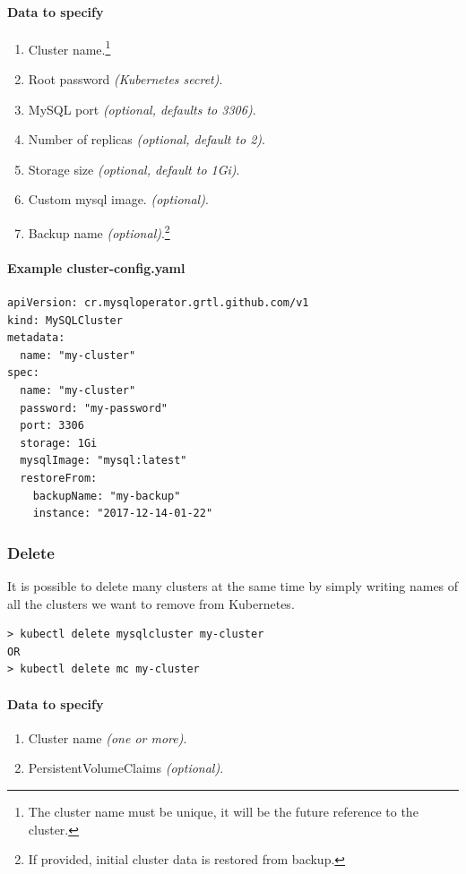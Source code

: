 \paragraph{Data to specify}
\begin{enumerate}
	\item Cluster name.\footnote{The cluster name must be unique, it will be the future reference
	to the cluster.}
	\item Root password \textit{(Kubernetes secret)}.
	\item MySQL port \textit{(optional, defaults to 3306)}.
	\item Number of replicas \textit{(optional, default to 2)}.
	\item Storage size \textit{(optional, default to 1Gi)}.
	\item Custom mysql image. \textit{(optional)}.
	\item Backup name \textit{(optional)}.\footnote{If provided, initial cluster data is restored
	from backup.}
\end{enumerate}

\paragraph{Example \textbf{cluster-config.yaml}}
\begin{lstlisting}[caption=cluster-config.yaml,captionpos=b]
apiVersion: cr.mysqloperator.grtl.github.com/v1
kind: MySQLCluster
metadata:
  name: "my-cluster"
spec:
  name: "my-cluster"
  password: "my-password"
  port: 3306
  storage: 1Gi
  mysqlImage: "mysql:latest"
  restoreFrom: 
	backupName: "my-backup"
	instance: "2017-12-14-01-22"
\end{lstlisting}

\subsubsection*{Delete}

It is possible to delete many clusters at the same time by simply writing
names of all the clusters we want to remove from Kubernetes.

\begin{lstlisting}
> kubectl delete mysqlcluster my-cluster
OR
> kubectl delete mc my-cluster
\end{lstlisting}

\paragraph{Data to specify}
\begin{enumerate}
	\item Cluster name \textit{(one or more)}.
	\item PersistentVolumeClaims \textit{(optional)}.
\end{enumerate}

